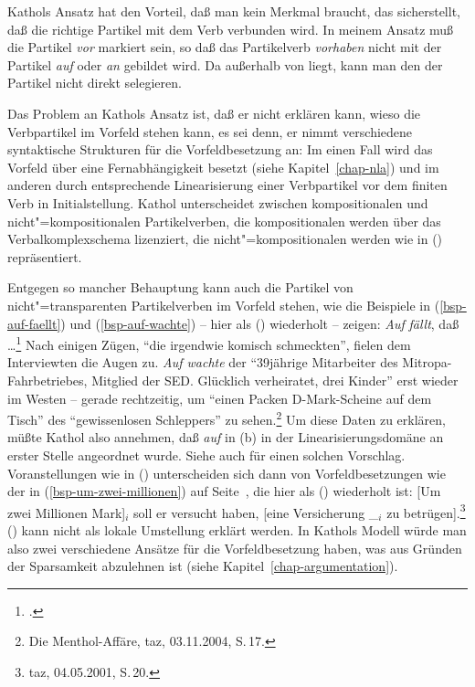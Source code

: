 Kathols Ansatz hat den Vorteil, daß man kein Merkmal braucht, das sicherstellt, daß
die richtige Partikel mit dem Verb verbunden wird. In meinem Ansatz muß die
Partikel \emph{vor} markiert sein, so daß das Partikelverb \emph{vorhaben} nicht mit der
Partikel \emph{auf} oder \emph{an} gebildet wird. Da \phon außerhalb von \synsem liegt,
kann man den \phonw der Partikel nicht direkt selegieren.

Das Problem an Kathols Ansatz ist, daß er nicht erklären kann, wieso die Verbpartikel
im Vorfeld stehen kann, es sei denn, er nimmt verschiedene syntaktische Strukturen für die
Vorfeldbesetzung an: Im einen Fall wird das Vorfeld über eine Fernabhängigkeit
besetzt (siehe Kapitel~\ref{chap-nla}) und im anderen durch entsprechende Linearisierung einer
Verbpartikel vor dem finiten Verb in Initialstellung. Kathol unterscheidet zwischen kompositionalen
und nicht"=kompositionalen Partikelverben, die kompositionalen werden über das Verbalkomplexschema
lizenziert, die nicht"=kompositionalen werden wie in () repräsentiert.

Entgegen so mancher Behauptung kann auch die Partikel von nicht"=transparenten Partikelverben im
Vorfeld stehen, wie die Beispiele in (\ref{bsp-auf-faellt}) und (\ref{bsp-auf-wachte}) -- hier als ()
wiederholt -- zeigen:
\eal
\ex{}
\emph{Auf} {\em fällt}, daß \ldots\footnote{
        .%
}
\ex Nach einigen Zügen, "`die irgendwie komisch schmeckten"', fielen dem Interviewten die Augen zu. 
\emph{Auf wachte} der "`39jährige Mitarbeiter des Mitropa-Fahrbetriebes, Mitglied der SED. Glücklich verheiratet, drei Kinder"'
erst wieder im Westen -- gerade rechtzeitig, um "`einen Packen D-Mark-Scheine auf dem Tisch"' 
des "`gewissenlosen Schleppers"' zu sehen.\footnote{
  Die Menthol-Affäre, taz, 03.11.2004, S.\,17.%
}
\zl
Um diese Daten zu erklären, müßte Kathol also annehmen, daß \emph{auf} in (b)
in der Linearisierungsdomäne an erster Stelle angeordnet wurde. Siehe auch 
für einen solchen Vorschlag.
Voranstellungen wie in () unterscheiden sich dann von Vorfeldbesetzungen wie der in 
(\ref{bsp-um-zwei-millionen}) auf Seite~\pageref{bsp-um-zwei-millionen},
die hier als () wiederholt ist:
\ea\label{bsp-um-zwei-millionen-zwei}
{}[Um zwei Millionen Mark]$_i$ soll er versucht haben, [eine Versicherung \_$_i$ zu betrügen].\footnote{
         taz, 04.05.2001, S.\,20.
}
\z
() kann nicht als lokale Umstellung erklärt werden.
In Kathols Modell würde man also zwei verschiedene Ansätze für die Vorfeldbesetzung haben,
was aus Gründen der Sparsamkeit abzulehnen ist (siehe Kapitel~\ref{chap-argumentation}).

